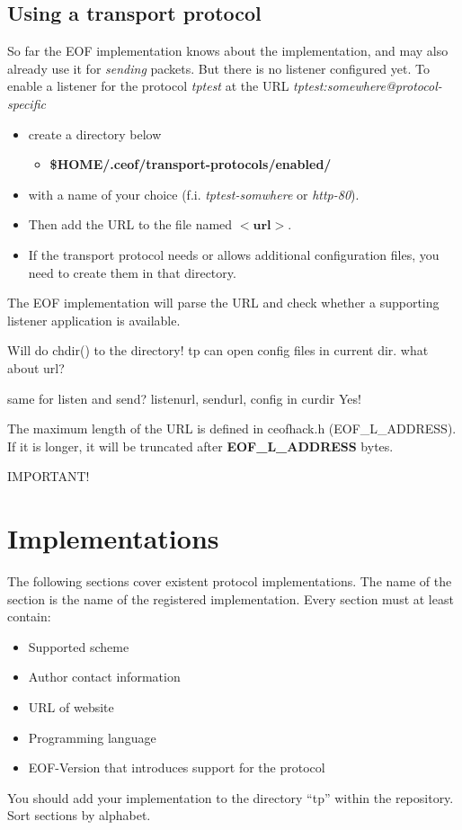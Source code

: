 \documentclass[12pt,a4paper]{book}
\begin{document}
\subsection{Using a transport protocol}
So far the EOF implementation knows about the implementation, and may also
already use it for \emph{sending} packets. But there is no listener configured
yet.
To enable a listener for the protocol \emph{tptest} at the URL
\emph{tptest:somewhere@protocol-specific}
\begin{itemize}
\item create a directory below
\begin{itemize}
\item \textbf{\$HOME/.ceof/transport-protocols/enabled/}
\end{itemize}
\item with a name of your choice (f.i. \emph{tptest-somwhere} or \emph{http-80}).
\item Then add the URL to the file named $<\textbf{url}>$.
\item If the transport protocol needs or allows additional configuration files,
you need to create them in that directory.
\end{itemize}
The EOF implementation will parse the URL and check whether a supporting
listener application is available.

Will do chdir() to the directory! tp can open config files in current dir.
what about url?

same for listen and send?
   listenurl, sendurl, config in curdir
Yes!

The maximum length of the URL is defined in ceofhack.h (EOF\_L\_ADDRESS).
If it is longer, it will be truncated after \textbf{EOF\_L\_ADDRESS} bytes.

IMPORTANT!
\section{Implementations}
The following sections cover existent protocol implementations.
The name of the section is the name of the registered implementation.
Every section must at least contain:
\begin{itemize}
\item Supported scheme
\item Author contact information
\item URL of website
\item Programming language
\item EOF-Version that introduces support for the protocol
\end{itemize}
You should add your implementation to the directory "`tp"' within the
repository.
Sort sections by alphabet.
\end{document}
